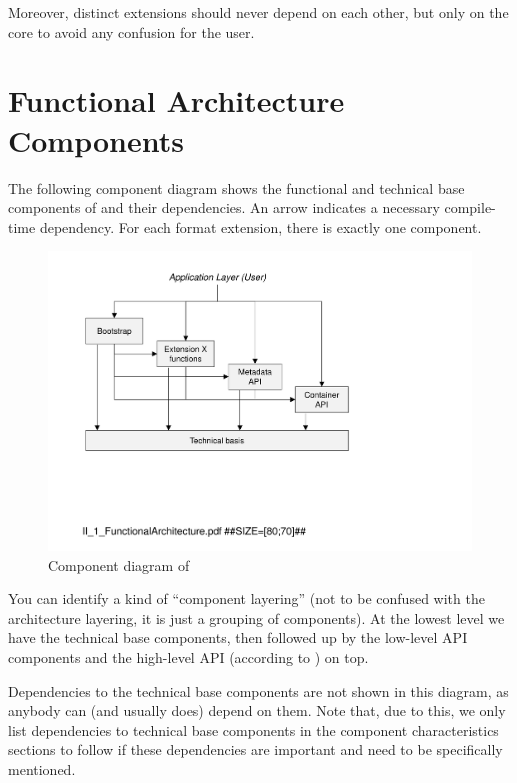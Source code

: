 Moreover, distinct extensions should never depend on each other, but only on the \LibName{} core to avoid any confusion for the user.


\section{Functional Architecture Components}
\label{sec:Subsystems}

The following component diagram shows the functional and technical base components of \LibName{} and their dependencies. An arrow indicates a necessary compile-time dependency. For each format extension, there is exactly one component.

\begin{figure}[H]
\centering
\includegraphics[width=1.00\textwidth]{figures/II_FunctionalArchitecture.pdf}
\caption{Component diagram of \LibName{}}
\label{fig:5_3_SCH_TechnicalArchitecture}
\end{figure}

You can identify a kind of ``component layering'' (not to be confused with the architecture layering, it is just a grouping of components). At the lowest level we have the technical base components, then followed up by the low-level API components and the high-level API (according to ) on top.

Dependencies to the technical base components are not shown in this diagram, as anybody can (and usually does) depend on them. Note that, due to this, we only list dependencies to technical base components in the component characteristics sections to follow if these dependencies are important and need to be specifically mentioned.

